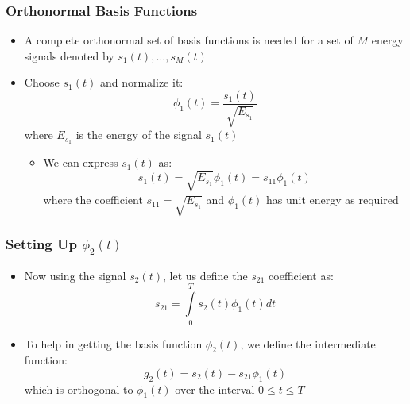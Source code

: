 \documentclass[10pt]{beamer}
\begin{document}
\frame
{
  \frametitle{Orthonormal Basis Functions}

    \begin{itemize}
        \item A complete orthonormal set of basis functions is needed for a set of $M$ energy signals denoted by $s_1(t),\ldots,s_M(t)$
            \item Choose $s_1(t)$ and normalize it:
            \begin{equation}
                \phi_1(t)=\frac{s_1(t)}{\sqrt{E_{s_1}}}\nonumber
            \end{equation}
            where $E_{s_1}$ is the energy of the signal $s_1(t)$
            \begin{itemize}
                \item We can express $s_1(t)$ as:
                \begin{equation}
                    s_1(t)=\sqrt{E_{s_1}}\phi_1(t)=s_{11}\phi_1(t)\nonumber
                \end{equation}
                where the coefficient $s_{11}=\sqrt{E_{s_1}}$ and $\phi_1(t)$ has unit energy as required
            \end{itemize}
    \end{itemize}

}

\frame
{
  \frametitle{Setting Up $\phi_2(t)$}

        \begin{itemize}
            \item Now using the signal $s_2(t)$, let us define the $s_{21}$ coefficient as:
            \begin{equation}
                s_{21}=\int\limits_{0}^{T}s_2(t)\phi_1(t)dt\nonumber
            \end{equation}
                \item To help in getting the basis function $\phi_2(t)$, we define the intermediate function:
                \begin{equation}
                    g_2(t)=s_2(t)-s_{21}\phi_1(t)\nonumber
                \end{equation}
                which is orthogonal to $\phi_1(t)$ over the interval $0\le{t}\le{T}$
        \end{itemize}

}
\end{document}
